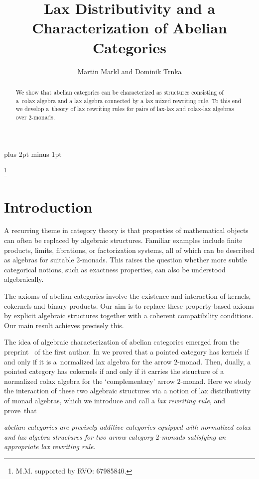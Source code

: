 \documentclass[12pt,leqno]{amsart}
\title[Lax Distributivity and Abelian Categories]
{Lax Distributivity and a Characterization of Abelian Categories}
\author[M.\ Markl, D.\ Trnka]{Martin Markl and Dominik Trnka}
\theoremstyle{definition}
\newcommand{\4}{\texttt{4}}
\begin{document}
\baselineskip 17pt plus 2pt minus 1pt

\begin{abstract}
 We show that abelian categories can be characterized as structures
 consisting of a~colax algebra and a lax algebra
 connected by a lax mixed rewriting rule. To this end we develop 
a~theory of  lax rewriting rules for pairs of lax-lax and
 colax-lax algebras over $2$-monads.
\end{abstract}

\thanks{M.M. supported by  RVO: 67985840.}

\maketitle

\tableofcontents

\section*{Introduction}

A recurring theme in category theory is that properties of
mathematical objects can often be replaced by algebraic structures. Familiar
examples include finite products, limits, fibrations, or factorization systems,
all of which can be described as algebras for suitable
2-monads. This raises the question whether more subtle categorical
notions, such as exactness properties, can also be understood
algebraically.

The axioms of abelian categories involve
the existence and interaction of kernels, cokernels and binary
products. Our aim is to replace these property-based axioms by explicit
algebraic structures together with a coherent compatibility
conditions. Our main result achieves precisely this.

The idea of algebraic characterization of abelian categories emerged
from the preprint~\cite{bivar} of the first author. In
\cite{pasticio} we proved that a pointed category has kernels if
and only if it is a~normalized lax algebra for
the arrow $2$-monad. Then, dually, a pointed category has cokernels
if and only if it carries the structure of a normalized colax algebra
for the `complementary' arrow $2$-monad. Here we study the
interaction of these two algebraic structures via a notion of lax 
distributivity of monad algebras, which we introduce and 
call a \textit{lax rewriting rule},
and prove~that

\begin{center}
\textit{abelian categories are precisely additive categories equipped with
normalized colax and lax algebra structures for two arrow category
$2$-monads satisfying an appropriate lax rewriting rule.}
\end{center}
\end{document}
